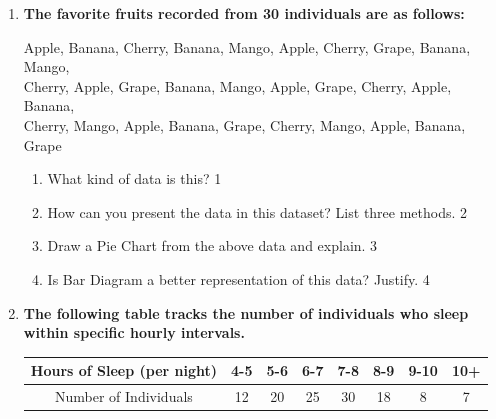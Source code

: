 \documentclass[a4paper,oneside]{book}
\begin{document}
\begin{enumerate}
  
  \begin{enumerate}
    \item
	What is nominal data? \hfill 1
    \item
	What are the ways to deal with categorical data? \hfill 2
    \item  
	Draw a Pie Chart from the above data and explain. \hfill 3
    \item
	Is Bar Diagram a better representation of this data? Justify. \hfill 4
  \end{enumerate}
  
  \item
	  \textbf{The favorite fruits recorded from 30 individuals are as follows:} 
	  
	   \begin{centering}
    Apple, Banana, Cherry, Banana, Mango, Apple, Cherry, Grape, Banana, Mango, \\
    Cherry, Apple, Grape, Banana, Mango, Apple, Grape, Cherry, Apple, Banana, \\
    Cherry, Mango, Apple, Banana, Grape, Cherry, Mango, Apple, Banana, Grape \\
    \end{centering}
  
  \begin{enumerate}
    \item
	What kind of data is this? \hfill 1
    \item
	How can you present the data in this dataset? List three methods. \hfill 2
    \item  
	Draw a Pie Chart from the above data and explain. \hfill 3
    \item
	Is Bar Diagram a better representation of this data? Justify. \hfill 4
  \end{enumerate}
  
     \item
	  \textbf{The following table tracks the number of individuals who sleep 
	  within specific hourly intervals. }
	  
\begin{table}[h]
  \centering
\begin{tabular}{c|c|c|c|c|c|c|c}
Hours of Sleep (per night) & 4-5   & 5-6   & 6-7   & 7-8   & 8-9   & 9-10  & 10+   \\ \hline
Number of Individuals      & 12    & 20    & 25    & 30    & 18    & 8     & 7     
\end{tabular}
\end{table}



\end{enumerate}
\end{document}
